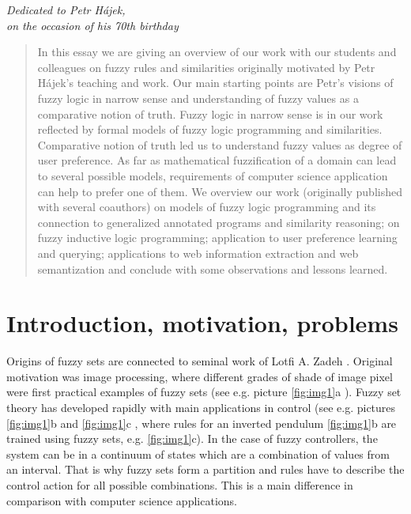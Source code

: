 \vspace{-1.2cm}

\begin{flushright}
\textsl{Dedicated to Petr H\'ajek,
\\on the occasion of his 70th birthday}
\end{flushright}

\vspace{0.1cm}

\begin{abstract}
In this essay we are giving an overview of our work with our students and colleagues on fuzzy rules and similarities originally motivated by Petr H\'{a}jek's teaching and work. Our main starting points are Petr's visions of fuzzy logic in narrow sense and understanding of fuzzy values as a comparative notion of truth. Fuzzy logic in narrow sense is in our work reflected by formal models of fuzzy logic programming and similarities. Comparative notion of truth led us to understand fuzzy values as degree of user preference. As far as mathematical fuzzification of a domain can lead to several possible models, requirements of computer science application can help to prefer one of them. We overview our work (originally published with several coauthors) on models of fuzzy logic programming and its connection to generalized annotated programs and similarity reasoning; on fuzzy inductive logic programming; application to user preference learning and querying; applications to web information extraction and web semantization and conclude with some observations and lessons learned.
\end{abstract}


\section{Introduction, motivation, problems}

     Origins of fuzzy sets are connected to seminal work of Lotfi A. Zadeh \cite{Z}. Original motivation was image processing, where different grades of shade of image pixel were first practical examples of fuzzy sets (see e.g. picture \ref{fig:img1}a \cite{p1a}). Fuzzy set theory has developed rapidly with main applications in control (see e.g. pictures \ref{fig:img1}b and \ref{fig:img1}c \cite{p1bc}, where rules for an inverted pendulum \ref{fig:img1}b are trained using fuzzy sets, e.g. \ref{fig:img1}c). In the case of fuzzy controllers, the system can be in a continuum of states which are a combination of values from an interval. That is why fuzzy sets form a partition and rules have to describe the control action for all possible combinations. This is a main difference in comparison with computer science applications.


